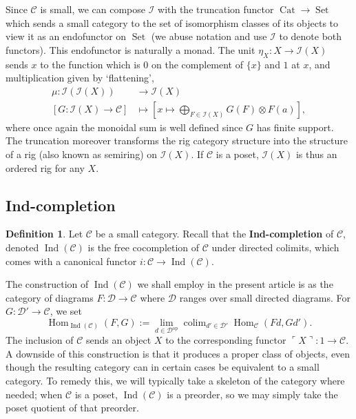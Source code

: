\documentclass[12pt]{article}
\theoremstyle{plain}
\theoremstyle{definition}
\newtheorem{defn}[thm]{Definition} %
\newcommand{\call}[1]{\mathcal{#1}}
\newcommand{\Ccal}{\call{C}}
\newcommand{\Dcal}{\call{D}}
\newcommand{\Ical}{\call{I}}
\DeclareMathOperator{\set}{Set}
\DeclareMathOperator{\cat}{Cat}
\DeclareMathOperator{\ind}{Ind}
\DeclareMathOperator{\Hom}{Hom}
\DeclareMathOperator{\colim}{colim}
\newcommand{\op}{{}^{\mathrm{op}}}
\begin{document}
Since $\Ccal$ is small, we can compose $\Ical$ with the truncation functor $\cat \to \set$ which sends a small category to the set of isomorphism classes of its objects to view it as an endofunctor on $\set$ (we abuse notation and use $\Ical$ to denote both functors). This endofunctor is naturally a monad. The unit $\eta_X: X \to \Ical(X)$ sends $x$ to the function which is $0$ on the complement of $\{x\}$ and $1$ at $x$, and multiplication given by `flattening',
\begin{align*}
\mu: \Ical(\Ical(X)) &\to \Ical(X) \\
\left[G:\Ical(X) \to \Ccal\right] &\mapsto \left[x \mapsto \bigoplus_{F \in \Ical(X)} G(F) \otimes F(a) \right],
\end{align*}
where once again the monoidal sum is well defined since $G$ has finite support. The truncation moreover transforms the rig category structure into the structure of a rig (also known as semiring) on $\Ical(X)$. If $\Ccal$ is a poset, $\Ical(X)$ is thus an ordered rig for any $X$.

\subsection{Ind-completion}

\begin{defn}
Let $\Ccal$ be a small category. Recall that the \textbf{Ind-completion} of $\Ccal$, denoted $\ind(\Ccal)$ is the free cocompletion of $\Ccal$ under directed colimits, which comes with a canonical functor $i: \Ccal \to \ind(\Ccal)$.
\end{defn}

The construction of $\ind(\Ccal)$ we shall employ in the present article is as the category of diagrams $F:\Dcal \to \Ccal$ where $\Dcal$ ranges over small directed diagrams. For $G: \Dcal' \to \Ccal$, we set
\[\Hom_{\ind(\Ccal)}(F,G) := \lim_{d \in \Dcal\op}\colim_{d' \in \Dcal'}\Hom_{\Ccal}(Fd,Gd').\]
The inclusion of $\Ccal$ sends an object $X$ to the corresponding functor $\ulcorner X \urcorner: 1 \to \Ccal$. A downside of this construction is that it produces a proper class of objects, even though the resulting category can in certain cases be equivalent to a small category. To remedy this, we will typically take a skeleton of the category where needed; when $\Ccal$ is a poset, $\ind(\Ccal)$ is a preorder, so we may simply take the poset quotient of that preorder.
\end{document}
